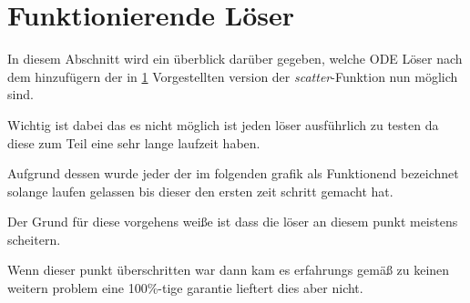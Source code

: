 \section{Funktionierende Löser}

In diesem Abschnitt wird ein überblick darüber gegeben, welche 
ODE Löser nach dem hinzufügern der in \ref{} Vorgestellten 
version der \textit{scatter}-Funktion nun möglich sind.

Wichtig ist dabei das es nicht möglich ist jeden löser ausführlich zu testen
da diese zum Teil eine sehr lange laufzeit haben.

Aufgrund dessen wurde jeder der im folgenden grafik als Funktionend 
bezeichnet solange laufen gelassen bis dieser den ersten zeit schritt gemacht hat.

Der Grund für diese vorgehens weiße ist dass die löser an diesem punkt meistens scheitern.

Wenn dieser punkt überschritten war dann kam es erfahrungs gemäß zu keinen 
weitern problem eine 100\%-tige garantie lieftert dies aber nicht.

